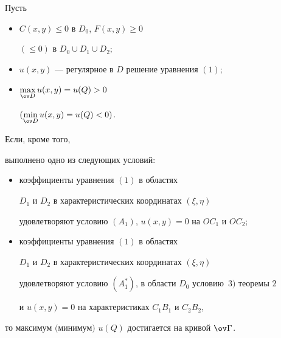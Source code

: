 \begin{thm}


Пусть


\begin{itemize}


\item[1)] $C(x,y)\le 0$ в $D_0$, $F(x,y)\ge 0$


$(\le 0)$ в $D_0\cup D_1\cup D_2;$


\item[2)] $u(x,y)$ --- регулярное в $D$ решение уравнения $(1);$


\item[3)] $\max \limits_{\ov D} u(x,y)=u(Q)>0$


$(\min \limits_{\ov D} u(x,y)=u(Q)<0)$.


\end{itemize}


Если, кроме того,


выполнено одно из следующих условий${:}$


\begin{itemize} 


\begin{itemize}


\item[a)] коэффициенты уравнения $(1)$ в областях


$D_1$ и $D_2$ в характеристических координатах $(\xi,\eta)$


удовлетворяют условию $(A_1)$, $u(x,y)=0$ на $OC_1$ и $OC_2;$


\item[б)] коэффициенты уравнения $(1)$ в областях


$D_1$ и $D_2$ в характеристических координатах $(\xi,\eta)$


удовлетворяют условию $(A_1^*)$, в области $D_0$ условию~$3)$ теоремы $2$


и $u(x,y)=0$ на характеристиках $C_1B_1$ и $C_2B_2$, 


\end{itemize}


\end{itemize}


то максимум $($минимум$)$ $u(Q)$ достигается на кривой $\ov \Gamma$.


\end{thm}





